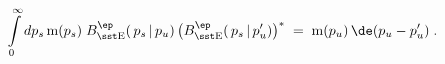 \begin{equation}\label{unit}
\int\limits_{0}^{\infty}dp_s\,{\rm m}(p_s)\;
B_{\rm\sst E}^{\ep}(\,p_s\,|\,p_u)\,
\big(B_{\rm\sst E}^{\ep}(\,p_s\,|\,p_u')\big)^{*}\;=\;
{\rm m}(p_u)\,\de(p_u-p_u')\; .
\end{equation}

